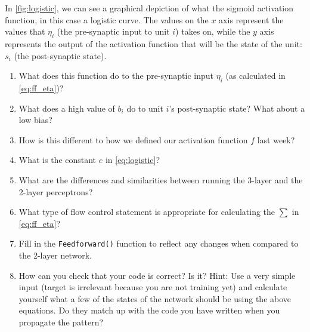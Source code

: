\documentclass[a4paper,10pt]{article}
\begin{document}
In \autoref{fig:logistic}, we can see a graphical depiction of what the sigmoid activation function, in this case a logistic curve. The values on the $x$ axis represent the values that $\eta_i$ (the pre-synaptic input to unit $i$) takes on, while the $y$ axis represents the output of the activation function that will be the state of the unit: $s_i$ (the post-synaptic state).

\begin{enumerate}
 \item What does this function do to the pre-synaptic input $\eta_i$ (as calculated in \autoref{eq:ff_eta})?

\item What does a high value of $b_i$ do to unit $i$'s post-synaptic state? What about a low bias? 
 
 \item How is this different to how we defined our activation function $f$ last week?
 
 \item What is the constant $e$ in \autoref{eq:logistic}? 
 
 \item What are the differences and similarities between running the 3-layer and the 2-layer perceptrons? 
 
 \item What type of flow control statement is appropriate for calculating the $\sum$ in \autoref{eq:ff_eta}?

 
 \item Fill in the \texttt{Feedforward()} function to reflect any changes when compared to the 2-layer network. 
 
 
 \item How can you check that your code is correct? Is it?  Hint: Use a very simple input (target is irrelevant because you are not training yet) and calculate yourself what a few of the states of the network should be using the above equations. Do they match up with the code you have written when you propagate the pattern? 
 
\end{enumerate}
\end{document}
